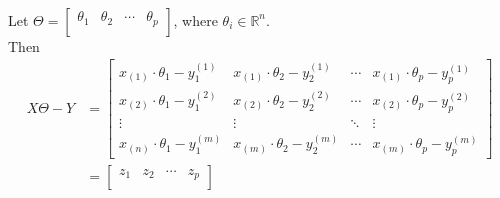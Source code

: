 \documentclass{article}
\newcommand{\R}{\mathbb{R}}
\begin{document}
\\Let \(\Theta = \begin{bmatrix}
 \theta_1 & \theta_2 & \cdots  & \theta_p \\
\end{bmatrix}\), where \(\theta_i \in \R^n\).
\\
Then
\begin{align*}
    X\Theta - Y &= 
    \begin{bmatrix}
        x_{(1)}\cdot \theta_{1}-y^{(1)}_{1} & x_{(1)}\cdot \theta_{2}-y^{(1)}_{2} & \cdots & x_{(1)}\cdot \theta_{p}-y^{(1)}_{p} \\
        x_{(2)}\cdot \theta_{1}-y^{(2)}_{1} & x_{(2)}\cdot \theta_{2}-y^{(2)}_{2} & \cdots & x_{(2)}\cdot \theta_{p}-y^{(2)}_{p} \\
        \vdots & \vdots & \ddots & \vdots \\
        x_{(n)}\cdot \theta_{1}-y^{(m)}_{1} & x_{(m)}\cdot \theta_{2}-y^{(m)}_{2} & \cdots & x_{(m)}\cdot \theta_{p}-y^{(m)}_{p}
    \end{bmatrix} \\
    & = \begin{bmatrix}
     z_1 & z_2 & \cdots  & z_{p} \\
    \end{bmatrix}
\end{align*}
\end{document}
